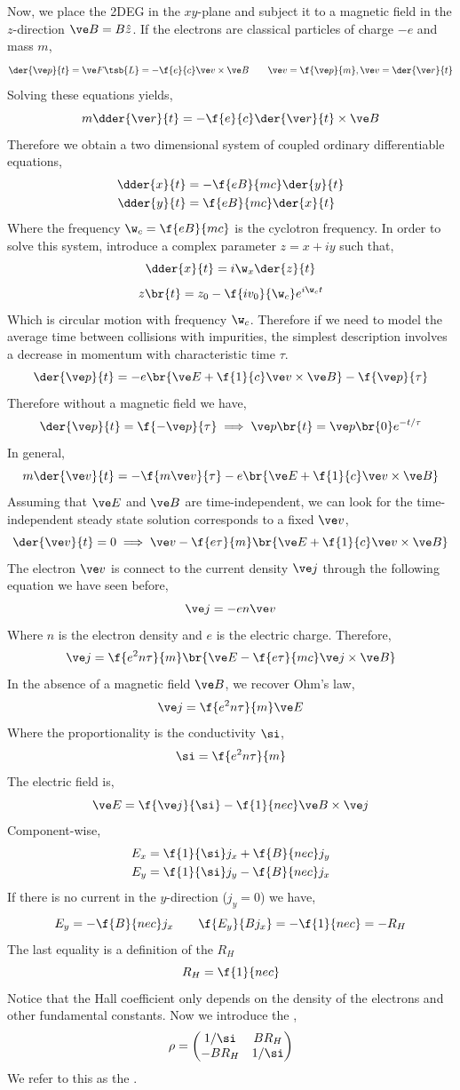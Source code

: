 \documentclass{article}
\begin{document}
Now, we place the 2DEG in the $xy$-plane and subject it to a magnetic field in the $z$-direction $\ve B = B \hat z$. If the electrons are classical particles of charge $-e$ and mass $m$,
\[ \der{\ve p}{t} = \ve F\tsb{L} = - \f{e}{c}\ve v \times \ve B \qquad \ve v = \f{\ve p}{m}, \ve v = \der{\ve r}{t} \]
Solving these equations yields,
\[ m \dder{\ve r}{t} = - \f{e}{c} \der{\ve r}{t} \times \ve B  \]
Therefore we obtain a two dimensional system of coupled ordinary differentiable equations,
\begin{align*}
\dder{x}{t} &= - \f{eB}{mc} \der{y}{t} \\
\dder{y}{t} &= \f{eB}{mc} \der{x}{t}
\end{align*}
Where the frequency $\w_c = \f{eB}{mc}$ is the cyclotron frequency. In order to solve this system, introduce a complex parameter $z = x + i y$ such that,
\[ \dder{x}{t} = i \w_x \der{z}{t} \]
\[ z\br{t} = z_0 - \f{i v_0}{\w_c}e^{i \w_c t}  \]
Which is circular motion with frequency $\w_c$. Therefore if we need to model the average time between collisions with impurities, the simplest description involves a decrease in momentum with characteristic time $\tau$.
\[ \der{\ve p}{t} = - e \br{\ve E + \f{1}{c} \ve v \times \ve B} - \f{\ve p}{\tau} \]
Therefore without a magnetic field we have,
\[ \der{\ve p}{t} = \f{- \ve p}{\tau} \implies \ve p\br{t} = \ve p\br{0} e^{- t/\tau} \]
In general,
\[ m\der{\ve v}{t} = - \f{m \ve v}{\tau} - e\br{\ve E + \f{1}{c} \ve v \times \ve B} \]
Assuming that $\ve E$ and $\ve B$ are time-independent, we can look for the time-independent steady state solution corresponds to a fixed $\ve v$,
\[ \der{\ve v}{t} = 0 \implies \ve v  -\f{e \tau}{m} \br{\ve E + \f{1}{c} \ve v \times \ve B} \]
The electron $\ve v$ is connect to the current density $\ve j$ through the following equation we have seen before,
\[ \ve j = - e n \ve v \]
Where $n$ is the electron density and $e$ is the electric charge. Therefore,
\[ \ve j = \f{e^2 n \tau}{m} \br{\ve E - \f{e \tau}{m c} \ve j \times \ve B} \]
In the absence of a magnetic field $\ve B$, we recover Ohm's law,
\[ \ve j = \f{e^2 n \tau}{m} \ve E \]
Where the proportionality is the conductivity $\si$,
\[ \si = \f{e^2 n \tau}{m} \]
The electric field is,
\[ \ve E = \f{\ve j}{\si} - \f{1}{nec} \ve B \times \ve j \]
Component-wise,
\begin{align*}
    E_x &= \f{1}{\si} j_x + \f{B}{nec} j_y \\
    E_y &= \f{1}{\si} j_y - \f{B}{nec} j_x
\end{align*}
If there is no current in the $y$-direction ($j_y = 0$) we have,
\[ E_y = -\f{B}{nec} j_x \qquad \f{E_y}{B j_x} = -\f{1}{nec} = - R_H \]
The last equality is a definition of the  $R_H$
\[ R_H = \f{1}{nec} \]
Notice that the Hall coefficient only depends on the density of the electrons and other fundamental constants. Now we introduce the ,
\[\rho = \begin{pmatrix}
    1 / \si & B R_{H} \\
    -B R_{H} & 1 / \si \\
\end{pmatrix} \]
We refer to this as the .
\end{document}

